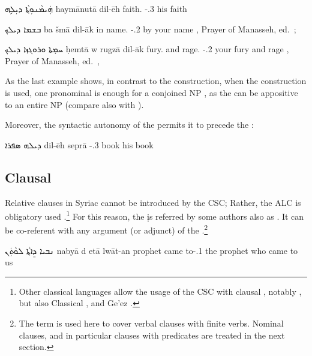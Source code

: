 {{  
  {ܗܲܝܡܵܢܘܼܬ݂ܵܐ ܕܝܼܠܹܗ}
  {haymānutā dil-ēh}
  {faith.\emp{} \lnk-\poss.3\masc}
  {his faith}
  {\cite[70, \S 93e]{MuraokaSyriac}}
  
   
  {ܒܫܡܐ ܕܝܠܟ}
  {ba\cb{} šmā dil-āk}
  {in\cb{} name.\emp{} \lnk-\poss.2\masc}
  {by your name}
  {\Pesh, Prayer of Manasseh, ed.\ \cite[B3]{BaarsSchneider}; \cite[90 (3B)]{GutmanVanPeursen}}
  
  {ܚܡ̣ܬܐ ܘܪܘ\hspace{-0.7ex}ܓܙܐ ܕܝܠܟ}
  {ḥemtā w\cb{} rugzā dil-āk}
  {fury.\emp{} and\cb{} rage.\emp{} \lnk-\poss.2\masc }
  {your fury and rage}
  {\Pesh, Prayer of Manasseh, ed.\ \cite[B5]{BaarsSchneider}, \cite[90 (4B)]{GutmanVanPeursen}}
  
  
  As the last example shows, in contrast to the  construction, when the \lnk* construction is used, one pronominal \secn is enough for a conjoined NP \prim, as the \lnk*  can be appositive to an entire NP (compare also with ). 
  
  Moreover, the syntactic autonomy of the \lnk* permits it to precede the \prim:
  
  {ܕܝܠܗ ܣܦܪܐ}
  {dil-ēh seprā}
  {\lnk-\poss.3\masc{} book}
  {his book}
  {\cite[71, \S 91f]{MuraokaSyriac}}

  
  \subsection{Clausal \secns} \label{ss:syr_ALC_clausal}
  
  Relative clauses in Syriac cannot be introduced by the CSC; Rather, the ALC is obligatory used \citep[236f.]{GoldenbergSemitic}.\footnote{Other classical  languages allow the usage of the CSC with clausal \secns, notably , but also Classical ,  and Ge'ez \citep[Ch.\ 14]{GoldenbergSemitic}.} For this reason, the \lnk* \d is referred by some authors also as  \citep[21, \S 15]{MuraokaSyriac}. It can be co-referent with any argument (or adjunct) of the .\footnote{The term  is used here to cover verbal clauses with finite verbs. Nominal clauses, and in particular clauses with  predicates are treated in the next section.}
  
  {ܢܒܝܐ ܕܸܐܬ݂ܵܐ ܠܘܵܬܲ\hspace{-0.7ex}ܢ}
  {nabyā d\cb{} etā lwāt-an}
  {prophet \lnk\cb{} came to-\poss.1\pl}
  {the prophet who came to us}
  {\cite[63, \S 77]{MuraokaSyriac}}
  
}}
